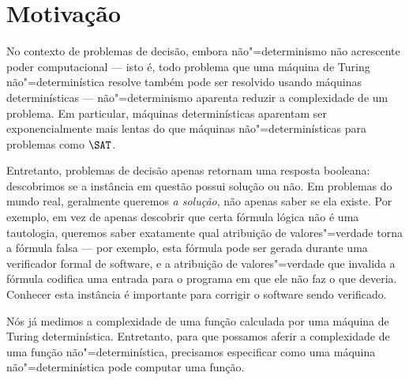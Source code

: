 \section{Motivação}

No contexto de problemas de decisão,
embora não"=determinismo não acrescente poder computacional
--- isto é,
todo problema que uma máquina de Turing não"=determinística resolve
também pode ser resolvido usando máquinas determinísticas
---
não"=determinismo aparenta reduzir a complexidade de um problema.
Em particular,
máquinas determinísticas aparentam ser exponencialmente mais lentas
do que máquinas não"=determinísticas
para problemas como $\SAT$.

Entretanto,
problemas de decisão apenas retornam uma resposta booleana:
descobrimos se a instância em questão possui solução ou não.
Em problemas do mundo real,
geralmente queremos \emph{a solução},
não apenas saber se ela existe.
Por exemplo,
em vez de apenas descobrir que certa fórmula lógica não é uma tautologia,
queremos saber exatamente qual atribuição de valores"=verdade
torna a fórmula falsa
--- por exemplo,
esta fórmula pode ser gerada durante uma verificador formal de software,
e a atribuição de valores"=verdade que invalida a fórmula
codifica uma entrada para o programa
em que ele não faz o que deveria.
Conhecer esta instância é importante para corrigir o software sendo verificado.

Nós já medimos a complexidade de uma função
calculada por uma máquina de Turing determinística.
Entretanto,
para que possamos aferir a complexidade de uma função não"=determinística,
precisamos especificar como uma máquina não"=determinística pode computar uma função.

